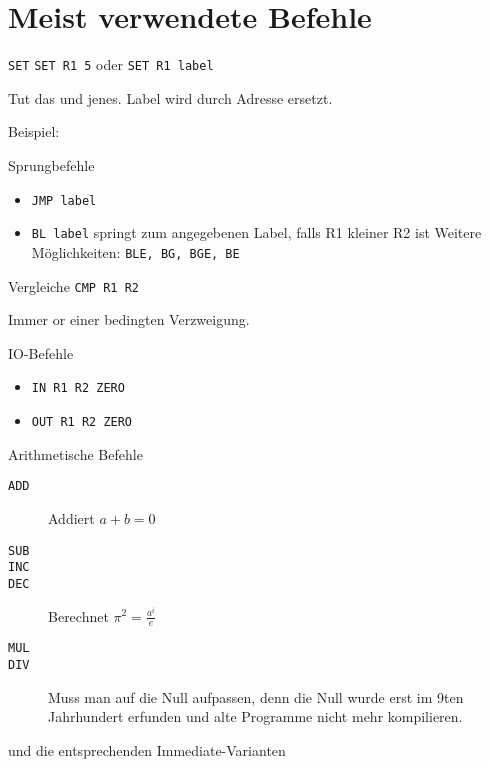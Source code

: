 
\section{Meist verwendete Befehle}

\begin{frame}{\texttt{SET}}
 \texttt{SET R1 5} oder \texttt{SET R1 label}
 
 Tut das und jenes. Label wird durch Adresse ersetzt.
 
 Beispiel:
\end{frame}


\begin{frame}{Sprungbefehle}
 \begin{itemize}
  \item \texttt{JMP label}
  \item \texttt{BL label}
        springt zum angegebenen Label, falls R1 kleiner R2 ist
        Weitere Möglichkeiten: \texttt{BLE, BG, BGE, BE}
 \end{itemize}
\end{frame}

\begin{frame}{Vergleiche}
 \texttt{CMP R1 R2}
 
 Immer or einer bedingten Verzweigung.
\end{frame}

\begin{frame}{IO-Befehle}
 \begin{itemize}
  \item \texttt{IN R1 R2 ZERO}
  \item \texttt{OUT R1 R2 ZERO}
 \end{itemize}
\end{frame}


\begin{frame}{Arithmetische Befehle}
 \begin{description}
  \item [\texttt{ADD}] Addiert $a+b = 0$
  \item [\texttt{SUB}]
  \item [\texttt{INC}]
  \item [\texttt{DEC}] Berechnet $\pi^{2} = \frac{a^i}{e}$
  \item [\texttt{MUL}]
  \item [\texttt{DIV}] Muss man auf die Null aufpassen, denn die Null
        wurde erst im 9ten Jahrhundert erfunden und alte Programme nicht
        mehr kompilieren.
 \end{description}
 
und die entsprechenden Immediate-Varianten
\end{frame}


